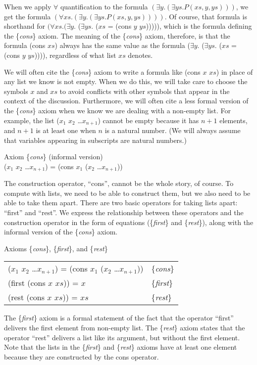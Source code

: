 When we apply $\forall$ quantification to the formula
$(\exists y.(\exists ys.P(xs, y, ys)))$,
we get the formula
$(\forall xs.(\exists y.(\exists ys.P(xs, y, ys))))$.
Of course, that formula is shorthand for
$(\forall xs.(\exists y.$ ($\exists ys.$ ($xs$ = (cons $y$ $ys$))))),
which is the formula defining the \{\emph{cons}\} axiom.
The meaning of the \{\emph{cons}\} axiom, therefore,
is that the formula (cons $xs$) always has the same value as the formula
($\exists y.$ ($\exists ys.$ ($xs$ = (cons $y$ $ys$)))),
regardless of what list $xs$ denotes.

We will often cite the \{\emph{cons}\} axiom to write 
a formula like (cons $x$ $xs$) in place of any list we know is not empty.
When we do this, we will take care to choose the symbols $x$ and $xs$ 
to avoid conflicts with other symbols that appear in the context of the discussion.
Furthermore, we will often cite a less formal version of the \{\emph{cons}\} axiom 
when we know we are dealing with a non-empty list. 
For example, the list ($x_1$ $x_2$ \dots $x_{n+1}$) 
cannot be empty because it has $n+1$ elements, and $n+1$ 
is at least one when $n$ is a natural number. 
(We will always assume that variables appearing in subscripts are natural numbers.)
\begin{center}
\label{cons-axiom-informal}
Axiom \{\emph{cons}\} (informal version) \\
($x_1$ $x_2$ \dots $x_{n+1}$) = (cons $x_1$ ($x_2$ \dots $x_{n+1}$))
\end{center}

The construction operator, ``cons'', cannot be the whole story, of course. 
To compute with lists, we  need to be able to construct them, 
but we also need to be able to take them apart. 
There are two basic operators for taking lists apart: ``first'' and ``rest''. 
We express the relationship between these operators and 
the construction operator in the form of equations 
(\{\emph{first}\} and \{\emph{rest}\}), 
along with the informal version of the \{\emph{cons}\} axiom.
\begin{center}
\label{first-rest-cons}
 Axioms \{\emph{cons}\}, \{\emph{first}\}, and \{\emph{rest}\} \\
\begin{tabular}{ll}
 ($x_1$ $x_2$ \dots $x_{n+1}$) = (cons $x_1$ ($x_2$ \dots $x_{n+1}$)) & \{\emph{cons}\} \\
 (first (cons $x$ $xs$)) = $x$                                        & \{\emph{first}\}\\
 (rest (cons $x$ $xs$))  = $xs$                                       & \{\emph{rest}\}
\end{tabular}
\end{center}
The \{\emph{first}\} axiom is a formal statement of the fact that 
the operator ``first'' delivers the first element from non-empty list. 
The \{\emph{rest}\} axiom states that the operator ``rest'' delivers 
a list like its argument, but without the first element. 
Note that the lists in the \{\emph{first}\} and \{\emph{rest}\} 
axioms have at least one element because they are constructed by the cons operator.

